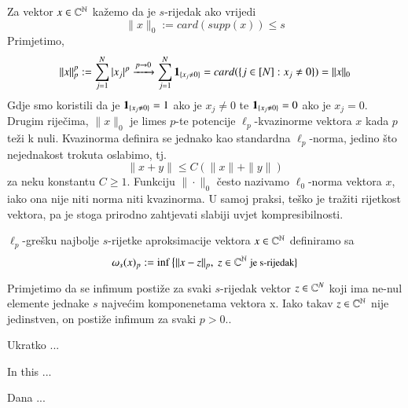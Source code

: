 \documentclass[a4paper,twoside,12pt]{memoir} %
\begin{document}
\noindent Za vektor $x\in\mathbb{C}^{\mathbb{N}}$ ka\v{z}emo da je $s$-rijedak ako vrijedi $$\|x\|_0 := card(supp(x)) \leq s$$
Primjetimo,
$$\|x\|_p^p := \sum_{j=1}^N|x_j|^p \xrightarrow{p\rightarrow 0} \sum_{j=1}^N\bold{1}_{\{x_j \neq 0\}} = card(\{j \in [N]:x_j \neq 0\}) = \|x\|_0$$
Gdje smo koristili da je $\bold{1}_{\{x_j \neq 0\}} = 1$  ako je $x_j \neq 0$ te $\bold{1}_{\{x_j \neq 0\}} = 0$  ako je $x_j = 0$. Drugim rije\v{c}ima, $\|x\|_0$ je limes $p$-te potencije $\ell_p$-kvazinorme vektora $x$ kada $p$ te\v{z}i k nuli. Kvazinorma definira se jednako kao standardna $\ell_p$-norma, jedino \v{s}to nejednakost trokuta oslabimo, tj. 
$$\|x+y\|\leq C(\|x\|+\|y\|)$$ 
za neku konstantu $C \geq 1$.
Funkciju $\|\cdot\|_0$ \v{c}esto nazivamo $\ell_0$-norma vektora $x$, iako  ona nije niti norma niti kvazinorma. U samoj praksi, te\v{s}ko je tra\v{z}iti rijetkost vektora, pa je stoga prirodno zahtjevati slabiji uvjet kompresibilnosti.  
\begin{defn}
    $\ell_p$-gre\v{s}ku najbolje $s$-rijetke aproksimacije vektora $x\in\mathbb{C}^{\mathbb{N}}$ definiramo sa 
    $$\omega_s(x)_p := \inf\big\{\|x-z\|_p,\ z \in \mathbb{C}^{\mathbb{N}} \ \small{\text{je s-rijedak}}\big\}$$
\end{defn}
\indent Primjetimo da se infimum posti\v{z}e za svaki $s$-rijedak vektor $z \in \mathbb{C}^{N}$ koji ima ne-nul elemente jednake $s$ najve\'cim komponenetama vektora x. Iako takav $z \in \mathbb{C}^{\mathbb{N}}$ nije jedinstven, on posti\v{z}e infimum za svaki $p > 0$..





\nocite{*}



\pagestyle{empty} %


\begin{sazetak}
Ukratko ...
\end{sazetak}

\begin{summary}
In this ...
\end{summary}


\begin{cv}
Dana ...
\end{cv}
\end{document}
